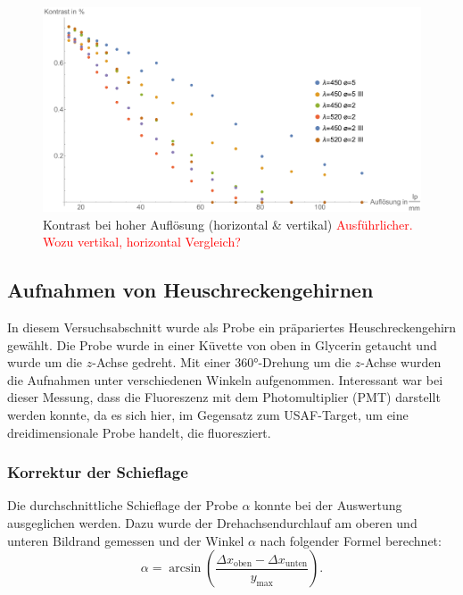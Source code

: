 \begin{figure}[H]
\centering
\includegraphics[width=1.0\linewidth]{IMAGE/Versuch2Plot2_all.pdf}
	\caption{Kontrast bei hoher Auflösung (horizontal \& vertikal) \textcolor{red}{Ausführlicher. Wozu vertikal, horizontal Vergleich?}}
	\label{fig:Versuch2_Plot2_all}
\end{figure}



\subsection{Aufnahmen von Heuschreckengehirnen}
In diesem Versuchsabschnitt wurde als Probe ein präpariertes Heuschreckengehirn gewählt.
Die Probe wurde in einer Küvette von oben in Glycerin getaucht und wurde um die $z$-Achse gedreht.
Mit einer 360°-Drehung um die $z$-Achse wurden die Aufnahmen unter verschiedenen Winkeln aufgenommen.
Interessant war bei dieser Messung, dass die Fluoreszenz mit dem Photomultiplier (PMT) darstellt werden konnte, da es sich hier, im Gegensatz zum USAF-Target, um eine dreidimensionale Probe handelt, die fluoresziert.

\subsubsection{Korrektur der Schieflage}
Die durchschnittliche Schieflage der Probe $\alpha$ konnte bei der Auswertung ausgeglichen werden.
Dazu wurde der Drehachsendurchlauf am oberen und unteren Bildrand gemessen und der Winkel $\alpha$ nach folgender Formel berechnet:
$$\alpha = \arcsin \left( \frac{\Delta{x_{\text{oben}}} - \Delta{x_{\text{unten}}}}{y_{\text{max}}} \right) .$$

